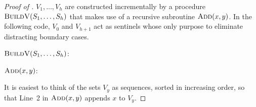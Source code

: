\documentclass[kpfonts]{patmorin}
\newcommand{\snote}[1]{\fcolorbox{red}{yellow}{#1}}
\newcommand{\pnote}[1]{\ \newline\noindent\fcolorbox{red}{yellow}{\begin{minipage}{\textwidth}#1\end{minipage}}}
\let\ge\geqslant
\begin{document}
\begin{proof}[Proof of ]
  $V_1,\ldots,V_{h}$ are constructed incrementally by a procedure $\textsc{BuildV}(S_1,\ldots,S_h)$ that makes use of a recursive subroutine $\textsc{Add}(x, y)$.  In the following code, $V_0$ and $V_{h+1}$ act as sentinels whose only purpose to eliminate distracting boundary cases.
  
  \noindent$\textsc{BuildV}(S_1,\ldots,S_h)$:
  \begin{algorithmic}[1]
        \ENDIF
      \ENDFOR
    \ENDFOR
  \end{algorithmic}
  
  \noindent$\textsc{Add}(x, y)$:
  \begin{algorithmic}[1]
      \IF{$|V_y|\ge 4$}      
        \ENDIF
      \ENDIF
    \ENDIF
  \end{algorithmic}

  It is easiest to think of the sets $V_y$ as sequences, sorted in increasing order, so that Line~2 in $\textsc{Add}(x,y)$ appends $x$ to $V_y$.
  

\end{proof}
\end{document}
